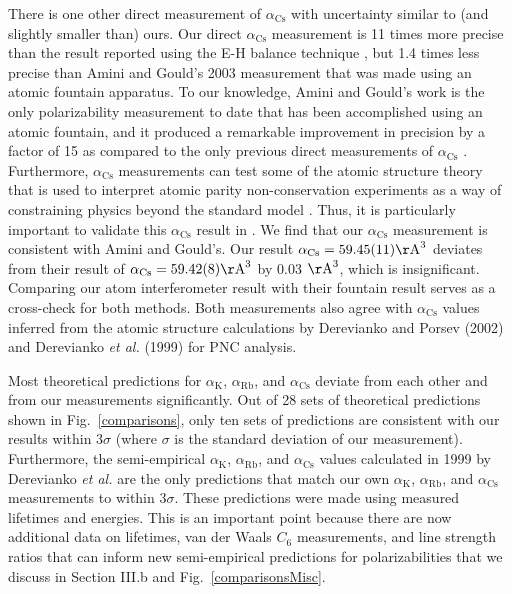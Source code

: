 \documentclass[twocolumn,pra,showpacs,superscriptaddress,longbibliography]{revtex4-1}   %
\newcommand{\figref}[1]{Fig.~\ref{#1}}
\newcommand{\ak}{\alpha_{\textrm{K}}}
\newcommand{\arb}{\alpha_{\textrm{Rb}}}
\newcommand{\acs}{\alpha_{\textrm{Cs}}}
\newcommand{\etalspace}{\textit{et al. }}
\newcommand{\AAA}{\mathrm{\AA}}
\begin{document}
There is one other direct measurement of $\acs$ with uncertainty similar to (and slightly smaller than) ours.  Our direct $\acs$ measurement is 11 times more precise than the result reported using the E-H balance technique \cite{Molof1974a}, but 1.4 times less precise than Amini and Gould's 2003 measurement \cite{Amini2003} that was made using an atomic fountain apparatus.
To our knowledge, Amini and Gould's work is the only polarizability measurement to date that has been accomplished using an atomic fountain, and it produced a remarkable improvement in precision by a factor of 15 as compared to the only previous direct measurements of $\acs$ \cite{Molof1974a,Hall1974}.  Furthermore, $\acs$ measurements can test some of the atomic structure theory that is used to interpret atomic parity non-conservation experiments as a way of constraining physics beyond the standard model \cite{Blundell1992,Cho1997,Derevianko2001,Porsev2009}. Thus, it is particularly important to validate this $\acs$ result in \cite{Amini2003}.  We find that our $\acs$ measurement is consistent with Amini and Gould's.  Our result $\acs = 59.45(11) \AAA^3$ deviates from their result of $\acs = 59.42(8) \AAA^3$ by 0.03 $\AAA^3$, which is insignificant.  Comparing our atom interferometer result with their fountain result serves as a cross-check for both methods.
Both measurements also agree with $\acs$ values inferred from the atomic structure calculations by Derevianko and Porsev (2002) \cite{Derevianko2001} and Derevianko \etalspace (1999) \cite{Derevianko1998} for PNC analysis.




Most theoretical predictions for $\ak$, $\arb$, and $\acs$ deviate from each other and from our measurements significantly.   Out of 28 sets of theoretical predictions shown in \figref{comparisons}, only ten sets of predictions \cite{Derevianko1998,Derevianko2001,Iskrenova-Tchoukova2007,Safronova2008,Safronova2011,
Nandy2012,Jiang2013,Sahoo2013,
Safronova2013,Borschevsky2013} are consistent with our results within 3$\sigma$ (where $\sigma$ is the standard deviation of our measurement). Furthermore, the semi-empirical $\ak$, $\arb$, and $\acs$ values calculated in 1999 by Derevianko \etalspace are the only predictions that match our own $\ak$, $\arb$, and $\acs$ measurements
to within 3$\sigma$. These predictions were made using measured lifetimes and energies.  This is an important point because there are now additional data on lifetimes, van der Waals $C_6$ measurements, and line strength ratios that can inform new semi-empirical predictions for polarizabilities that we discuss in Section III.b and \figref{comparisonsMisc}.
\end{document}

